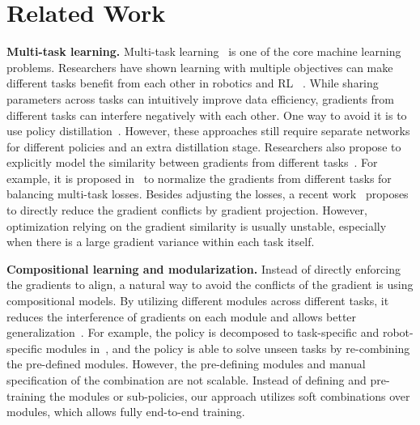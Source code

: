 \documentclass{article}
\begin{document}
\section{Related Work}\label{sec:related}
\vspace{-0.1in}
\label{related}
\textbf{Multi-task learning.} Multi-task learning~\cite{caruana1997multitask} is one of the core machine learning problems. Researchers have shown learning with multiple objectives can make different tasks benefit from each other in robotics and RL ~\cite{wilson2007multi,pinto2016curious,pinto2017learning,riedmiller2018learning,hausman2018learning,sax2019learning}. While sharing parameters across tasks can intuitively improve data efficiency, gradients from different tasks can interfere negatively with each other.
One way to avoid it is to use policy distillation~\cite{parisotto2015actor,rusu2015policy,teh2017distral, teh2017distral}.
However, these approaches still require separate networks for different policies and an extra distillation stage. 
Researchers also propose to explicitly model the similarity between gradients from different tasks~\cite{zhang2014regularization,chen2017gradnorm,kendall2018multi,lin2019adaptive,sener2018multi,du2018adapting,Yu2020surgery,hu2019learning}. For example, it is proposed in~\cite{chen2017gradnorm} to normalize the gradients from different tasks for balancing multi-task losses. Besides adjusting the losses, a recent work~\cite{Yu2020surgery} proposes to directly reduce the gradient conflicts by gradient projection. However, optimization relying on the gradient similarity is usually unstable, especially when there is a large gradient variance within each task itself. 



\textbf{Compositional learning and modularization.} Instead of directly enforcing the gradients to align, a natural way to avoid the conflicts of the gradient is using compositional models. By utilizing different modules across different tasks, it reduces the interference of gradients on each module and allows better generalization~\cite{singh1992transfer,devin2017learning,andreas2017modular,rusu2016progressive,yuzhe2020,peng2019mcp,haarnoja2018composable,sahni2017learning,Goyal2020Reinforcement}. For example, the policy is decomposed to task-specific and robot-specific modules in~\cite{devin2017learning}, and the policy is able to solve unseen tasks by re-combining the pre-defined modules. However, the pre-defining modules and manual specification of the combination are not scalable. Instead of defining and pre-training the modules or sub-policies, our approach utilizes soft combinations over modules, which allows fully end-to-end training. 
\end{document}
